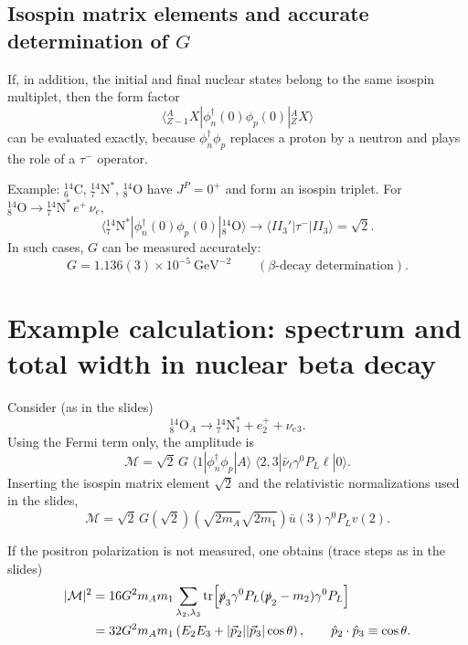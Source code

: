 \subsection{Isospin matrix elements and accurate determination of $G$}
If, in addition, the initial and final nuclear states belong to the same isospin multiplet,
then the form factor
\begin{equation}
\langle {}^{A}_{Z-1}X|\phi_n^\dagger(0)\phi_p(0)|{}^{A}_{Z}X\rangle
\end{equation}
can be evaluated exactly, because $\phi_n^\dagger\phi_p$ replaces a proton by a neutron
and plays the role of a $\tau^-$ operator.

Example: ${}^{14}_6\text{C}$, ${}^{14}_7\text{N}^\ast$, ${}^{14}_8\text{O}$ have $J^P=0^+$ and form an isospin triplet.
For ${}^{14}_8\text{O}\to {}^{14}_7\text{N}^\ast\,e^+\,\nu_e$,
\begin{equation}
\langle {}^{14}_7\text{N}^\ast|\phi_n^\dagger(0)\phi_p(0)|{}^{14}_8\text{O}\rangle
\to
\langle I I_3'|\tau^-|I I_3\rangle
=
\sqrt{2}.
\end{equation}
In such cases, $G$ can be measured accurately:
\begin{equation}
\boxed{G=1.136(3)\times 10^{-5}~\text{GeV}^{-2}\qquad(\beta\text{-decay determination}).}
\end{equation}

\section{Example calculation: spectrum and total width in nuclear beta decay}
Consider (as in the slides)
\begin{equation}
{}^{14}_8\text{O}_A \to {}^{14}_7\text{N}^\ast_{1} + e^+_2 + \nu_e{}_3.
\end{equation}
Using the Fermi term only, the amplitude is
\begin{equation}
\mathcal{M}
=
\sqrt{2}\,G\;\langle 1|\phi_n^\dagger\phi_p|A\rangle\;
\langle 2,3|\bar\nu_\ell\gamma^0 P_L \ell|0\rangle.
\end{equation}
Inserting the isospin matrix element $\sqrt2$ and the relativistic normalizations used in the slides,
\begin{equation}
\mathcal{M}
=
\sqrt{2}\,G
\left(\sqrt2\right)
\left(\sqrt{2m_A}\sqrt{2m_1}\right)
\bar u(3)\gamma^0 P_L v(2).
\end{equation}

If the positron polarization is not measured, one obtains (trace steps as in the slides)
\begin{align}
|\mathcal{M}|^2
&=
16G^2 m_A m_1
\sum_{\lambda_2,\lambda_3}
\mathrm{tr}\!\left[
\slashed{p}_3\gamma^0 P_L (\slashed{p}_2-m_2)\gamma^0 P_L
\right]\\
&=
32G^2 m_A m_1\left(E_2E_3+|\vec p_2||\vec p_3|\cos\theta\right),
\qquad
\hat p_2\cdot\hat p_3\equiv \cos\theta.
\end{align}

